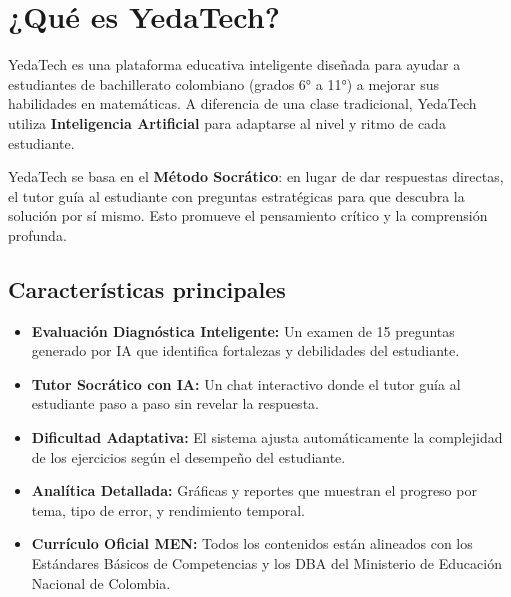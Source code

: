 \documentclass[12pt, a4paper]{article}
\begin{document}
\tableofcontents
\newpage

\section{¿Qué es YedaTech?}

YedaTech es una plataforma educativa inteligente diseñada para ayudar a estudiantes de bachillerato colombiano (grados 6° a 11°) a mejorar sus habilidades en matemáticas. A diferencia de una clase tradicional, YedaTech utiliza \textbf{Inteligencia Artificial} para adaptarse al nivel y ritmo de cada estudiante.

\begin{infobox}
YedaTech se basa en el \textbf{Método Socrático}: en lugar de dar respuestas directas, el tutor guía al estudiante con preguntas estratégicas para que descubra la solución por sí mismo. Esto promueve el pensamiento crítico y la comprensión profunda.
\end{infobox}

\subsection{Características principales}

\begin{itemize}[leftmargin=*, itemsep=6pt]
    \item[\textcolor{ytOrange}{\faIcon{clipboard-check}}] \textbf{Evaluación Diagnóstica Inteligente:} Un examen de 15 preguntas generado por IA que identifica fortalezas y debilidades del estudiante.
    \item[\textcolor{ytOrange}{\faIcon{brain}}] \textbf{Tutor Socrático con IA:} Un chat interactivo donde el tutor guía al estudiante paso a paso sin revelar la respuesta.
    \item[\textcolor{ytOrange}{\faIcon{sliders-h}}] \textbf{Dificultad Adaptativa:} El sistema ajusta automáticamente la complejidad de los ejercicios según el desempeño del estudiante.
    \item[\textcolor{ytOrange}{\faIcon{chart-bar}}] \textbf{Analítica Detallada:} Gráficas y reportes que muestran el progreso por tema, tipo de error, y rendimiento temporal.
    \item[\textcolor{ytOrange}{\faIcon{flag}}] \textbf{Currículo Oficial MEN:} Todos los contenidos están alineados con los Estándares Básicos de Competencias y los DBA del Ministerio de Educación Nacional de Colombia.
\end{itemize}
\end{document}
